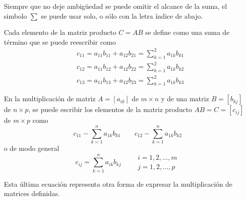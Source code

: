 Siempre que no deje ambigüedad se puede omitir el alcance de la suma, el simbolo \(\sum\) se puede usar solo, o sólo con la letra índice de abajo.

Cada elemento de la matriz producto \(C = AB\) se define como una suma de término que se puede reescribir como 
$$
\begin{aligned}
    & c_{11} = a_{11}b_{11} + a_{12}b_{21} = \sum_{k=1}^{2} a_{1k}b_{k1} \\
    & c_{12} = a_{11}b_{12} + a_{12}b_{22} = \sum_{k=1}^{2} a_{1k}b_{k2} \\
    & c_{13} = a_{11}b_{13} + a_{12}b_{23} = \sum_{k=1}^{2} a_{1k}b_{k3}
\end{aligned}
$$

En la multiplicación de matriz \(A = [a_{ik}]\) de \(m \times n\) y de una matriz \(B=[b_{kj}]\) de \(n \times p\), se puede escribir los elementos de la matriz producto \(AB = C = [c_{ij}]\) de \(m \times p\) como
\[
c_{11} - \sum_{k=1}^{n} a_{1k}b_{k1} \qquad  c_{12} - \sum_{k=1}^{n} a_{1k}b_{k2}
\]
o de modo general 
\[
c_{ij} = \sum_{k=1}^{n} a_{ik}b_{kj} \qquad \begin{matrix}
    i = 1,2, \dots, m \\
    j = 1,2, \dots, p
\end{matrix}
\]

Esta última ecuación representa otra forma de expresar la multiplicación de matrices definidas.


